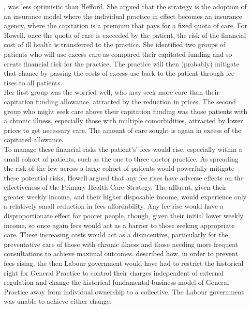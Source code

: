 \documentclass[11pt,a4paper]{article}
\begin{document}
\citet{howell2005restructuring}, was less optimistic than Hefford. She argued that the strategy is the adoption of an insurance model where the individual practice in effect becomes an insurance agency, where the capitation is a premium that pays for a fixed quota of care. For Howell, once the quota of care is exceeded by the patient, the risk of the financial cost of ill health is transferred to the practice. She identified two groups of patients who will use excess care as compared their capitated funding and so create financial risk for the practice. The practice will then (probably) mitigate that chance by passing the costs of excess use back to the patient through fee rises to all patients.\\


Her first group was the worried well, who may seek more care than their capitation funding allowance, attracted by the reduction in prices. The second group who might seek care above their capitation funding was those patients with a chronic illness, especially those with multiple comorbidities, attracted by lower prices to get necessary care. The amount of care sought is again in excess of the capitated allowance.\\  


To manage these financial risks the patient's’ fees would rise, especially within a small cohort of patients, such as the one to three doctor practice. As spreading the risk of the few across a large cohort of patients would powerfully mitigate these potential risks, Howell argued that any fee rises have adverse effects on the effectiveness of the Primary Health Care Strategy. The affluent, given their greater weekly income, and their higher disposable income,  would experience only a relatively small reduction in fees affordability. Any fee rise would have a disproportionate effect for poorer people, though, given their initial lower weekly income, so once again fees would act as a barrier to those seeking appropriate care. These increasing costs would act as a disincentive, particularly for the preventative care of those with chronic illness and those needing more frequent consultations to achieve maximal outcomes.  \citet{howell2005restructuring} described how, in order to prevent fees rising, the then Labour government would have had to restrict the historical right for General Practice to control their charges independent of external regulation and change the historical fundamental business model of General Practice away from individual ownership to a collective.  The Labour government was unable to achieve either change.\\
\end{document}
